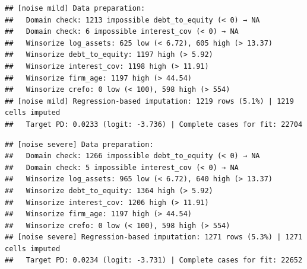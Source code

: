 \documentclass[
]{article}
\newenvironment{Shaded}{\begin{snugshade}}{\end{snugshade}}
\newcommand{\AttributeTok}[1]{\textcolor[rgb]{0.13,0.29,0.53}{#1}}
\newcommand{\FunctionTok}[1]{\textcolor[rgb]{0.13,0.29,0.53}{\textbf{#1}}}
\newcommand{\NormalTok}[1]{#1}
\newcommand{\OtherTok}[1]{\textcolor[rgb]{0.56,0.35,0.01}{#1}}
\newcommand{\SpecialCharTok}[1]{\textcolor[rgb]{0.81,0.36,0.00}{\textbf{#1}}}
\newcommand{\StringTok}[1]{\textcolor[rgb]{0.31,0.60,0.02}{#1}}
\begin{document}
\begin{verbatim}
## [noise mild] Data preparation:
##   Domain check: 1213 impossible debt_to_equity (< 0) → NA
##   Domain check: 6 impossible interest_cov (< 0) → NA
##   Winsorize log_assets: 625 low (< 6.72), 605 high (> 13.37)
##   Winsorize debt_to_equity: 1197 high (> 5.92)
##   Winsorize interest_cov: 1198 high (> 11.91)
##   Winsorize firm_age: 1197 high (> 44.54)
##   Winsorize crefo: 0 low (< 100), 598 high (> 554)
## [noise mild] Regression-based imputation: 1219 rows (5.1%) | 1219 cells imputed
##   Target PD: 0.0233 (logit: -3.736) | Complete cases for fit: 22704
\end{verbatim}

\begin{Shaded}
\end{Shaded}

\begin{verbatim}
## [noise severe] Data preparation:
##   Domain check: 1266 impossible debt_to_equity (< 0) → NA
##   Domain check: 5 impossible interest_cov (< 0) → NA
##   Winsorize log_assets: 965 low (< 6.72), 640 high (> 13.37)
##   Winsorize debt_to_equity: 1364 high (> 5.92)
##   Winsorize interest_cov: 1206 high (> 11.91)
##   Winsorize firm_age: 1197 high (> 44.54)
##   Winsorize crefo: 0 low (< 100), 598 high (> 554)
## [noise severe] Regression-based imputation: 1271 rows (5.3%) | 1271 cells imputed
##   Target PD: 0.0234 (logit: -3.731) | Complete cases for fit: 22652
\end{verbatim}

\begin{Shaded}
\end{Shaded}
\end{document}
